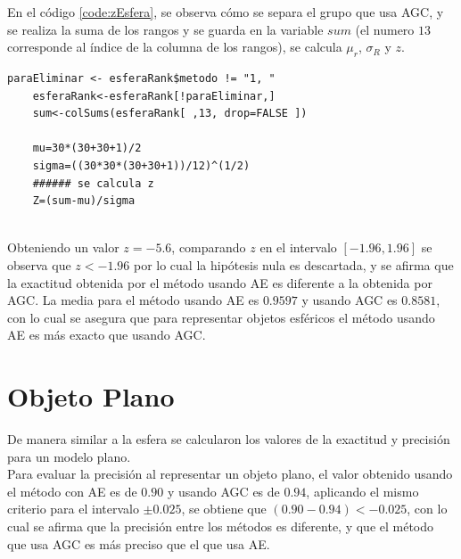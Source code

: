 En el código \ref{code:zEsfera}, se observa cómo se separa el grupo que usa AGC, y se realiza la suma de los rangos y se guarda en la variable $sum$ (el numero $13$ corresponde al índice de la columna de los rangos), se calcula $\mu_r$, $\sigma_R$ y $z$.\\

{\small 
	\label{code:zEsfera}
	\begin{lstlisting}[caption={Calculo de $z$.}]
	paraEliminar <- esferaRank$metodo != "1, "
	esferaRank<-esferaRank[!paraEliminar,]
	sum<-colSums(esferaRank[ ,13, drop=FALSE ])
	
	mu=30*(30+30+1)/2
	sigma=((30*30*(30+30+1))/12)^(1/2)
	###### se calcula z
	Z=(sum-mu)/sigma
	\end{lstlisting}
}$ $ \\

Obteniendo un valor $z=-5.6$, comparando $z$ en el intervalo $[-1.96,1.96]$ se observa que $z<-1.96$ por lo cual la hipótesis nula es descartada, y se afirma que la exactitud obtenida por el método usando AE es diferente a la obtenida por AGC. La media para el método usando AE es $0.9597$ y usando AGC es $0.8581$, con lo cual se asegura que para representar objetos esféricos el método usando AE es más exacto que usando AGC.




%
%

 
 


\section{Objeto Plano}

De manera similar a la esfera se calcularon los valores de la exactitud y precisión para un modelo \gls{plano}.\\

Para evaluar la precisión al representar un objeto plano, el valor obtenido usando el método  con AE es de $0.90$ y usando AGC es de $0.94$, aplicando el mismo criterio para el intervalo $\pm 0.025$, se obtiene que $(0.90-0.94)<-0.025$, con lo cual se afirma que la precisión entre los métodos es diferente, y que el método que usa AGC es más preciso que el que usa AE.\\

